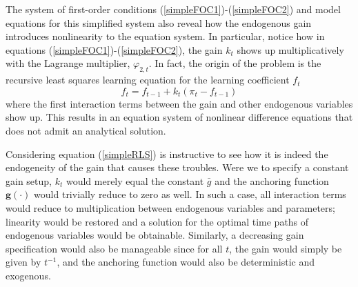 \documentclass[11pt]{article}
\renewcommand{\[}{\begin{equation}}
\renewcommand{\]}{\end{equation}}
\begin{document}
The system of first-order conditions (\ref{simpleFOC1})-(\ref{simpleFOC2}) and model equations for this simplified system also reveal how the endogenous gain introduces nonlinearity to the equation system. In particular, notice how in equations (\ref{simpleFOC1})-(\ref{simpleFOC2}), the gain $k_t$ shows up multiplicatively with the Lagrange multiplier, $\varphi_{2,t}$. In fact, the origin of the problem is the recursive least squares learning equation for the learning coefficient $f_t$
\begin{equation}
f_t = f_{t-1} + k_t(\pi_t - f_{t-1}) \label{simpleRLS}
\end{equation}
where the first interaction terms between the gain and other endogenous variables show up. This results in an equation system of nonlinear difference equations that does not admit an analytical solution. 

Considering equation (\ref{simpleRLS}) is instructive to see how it is indeed the endogeneity of the gain that causes these troubles. Were we to specify a constant gain setup, $k_t$ would merely equal the constant $\bar{g}$ and the anchoring function $\mathbf{g}(\cdot)$ would trivially reduce to zero as well. In such a case, all interaction terms would reduce to multiplication between endogenous variables and parameters; linearity would be restored and a solution for the optimal time paths of endogenous variables would be obtainable. Similarly, a decreasing gain specification would also be manageable since for all $t$, the gain would simply be given by $t^{-1}$, and the anchoring function would also be deterministic and exogenous. 
\end{document}
